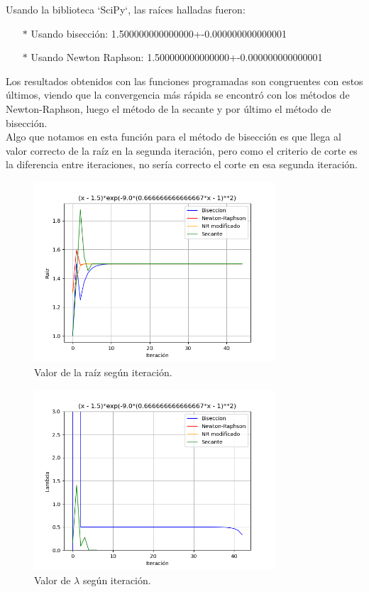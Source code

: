 \documentclass[titlepage,a4paper]{article}
\begin{document}
Usando la biblioteca `SciPy`, las raíces halladas fueron:
\begin{itemize}
    \item[$*$]Usando bisección:   1.500000000000000+-0.000000000000001
    \item[$*$]Usando Newton Raphson:  1.500000000000000+-0.000000000000001
\end{itemize}

Los resultados obtenidos con las funciones programadas son congruentes con estos últimos, viendo que la convergencia más rápida se encontró con los métodos de Newton-Raphson, luego el método de la secante y por último el método de bisección. 
\\Algo que notamos en esta función para el método de bisección es que llega al valor correcto de la raíz en la segunda iteración, pero como el criterio de corte es la diferencia entre iteraciones, no sería correcto el corte en esa segunda iteración.


\begin{figure}[H]
    \centering
    \includegraphics[width=0.8\textwidth]{raiz f3.png}
    \caption{\label{fig:class01}Valor de la raíz según iteración.}
\end{figure}

\begin{figure}[H]
    \centering
    \includegraphics[width=0.8\textwidth]{lambda f3.png}
    \caption{\label{fig:class01}Valor de $\lambda$ según iteración.}
\end{figure}
\end{document}
